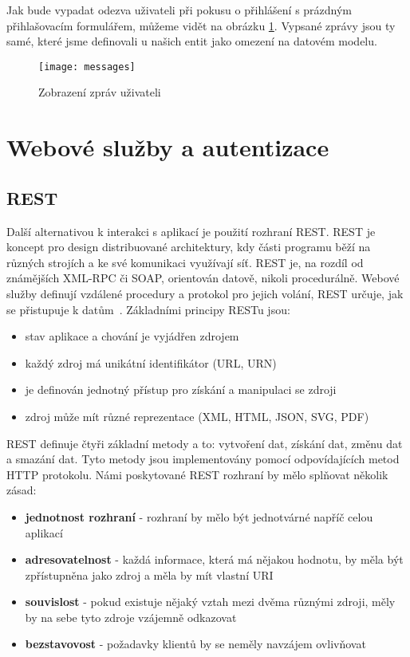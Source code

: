 \documentclass[122pt,oneside]{fithesis}
\begin{document}
Jak bude vypadat odezva uživateli při pokusu o přihlášení s prázdným přihlašovacím formulářem, můžeme vidět na obrázku \ref{img:messages}. Vypsané zprávy jsou ty samé, které jsme definovali u našich entit jako omezení na datovém modelu.  

\begin{figure}[!ht]
\centering
\texttt{[image: messages]}
\caption{Zobrazení zpráv uživateli}
\label{img:messages}
\end{figure}

\chapter{Webové služby a autentizace}
\section{REST}
\label{rest}
Další alternativou k interakci s aplikací je použití rozhraní REST. REST je koncept pro design distribuované architektury, kdy části programu běží na různých strojích a ke své komunikaci využívají síť. REST je, na rozdíl od známějších XML-RPC či SOAP, orientován datově, nikoli procedurálně. Webové služby definují vzdálené procedury a protokol pro jejich volání, REST určuje, jak se přistupuje k datům~\cite{maly09}. Základními principy RESTu jsou:

\begin{itemize}
  \item stav aplikace a chování je vyjádřen zdrojem
  \item každý zdroj má unikátní identifikátor (URL, URN)
  \item je definován jednotný přístup pro získání a manipulaci se zdroji
  \item zdroj může mít různé reprezentace (XML, HTML, JSON, SVG, PDF)
\end{itemize}

REST definuje čtyři základní metody a to: vytvoření dat, získání dat, změnu dat a smazání dat. Tyto metody jsou implementovány pomocí odpovídajících metod HTTP protokolu. Námi poskytované REST rozhraní by mělo splňovat několik zásad:

\begin{itemize}
  \item {\bf jednotnost rozhraní} - rozhraní by mělo být jednotvárné napříč celou aplikací
  \item {\bf adresovatelnost} - každá informace, která má nějakou hodnotu, by měla být zpřístupněna jako zdroj a měla by mít vlastní URI
  \item {\bf souvislost} - pokud existuje nějaký vztah mezi dvěma různými zdroji, měly by na sebe tyto zdroje vzájemně odkazovat
  \item {\bf bezstavovost} - požadavky klientů by se neměly navzájem ovlivňovat 
\end{itemize}
\end{document}
